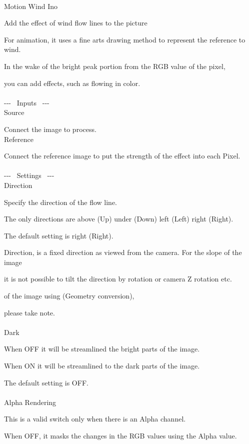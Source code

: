 \documentclass[a4paper,12pt]{article}
\begin{document}
\thispagestyle{empty}

\Large
\noindent \\
Motion Wind Ino\medskip
\par
\normalsize
Add the effect of wind flow lines to the picture\\
\par
For animation, it uses a fine arts drawing method to represent the reference to wind.\par
In the wake of the bright peak portion from the RGB value of the pixel,\par
you can add effects, such as flowing in color.\\
\\
-{-}- \ Inputs \ -{-}-\\
Source\par
Connect the image to process.\\
Reference\par
Connect the reference image to put the strength of the effect into each Pixel.\\
\\
-{-}- \ Settings \ -{-}-\\
Direction\par
Specify the direction of the flow line.\par
The only directions are above (Up) under (Down) left (Left) right (Right).\par
The default setting is right (Right).\par
Direction, is a fixed direction as viewed from the camera. For the slope of the image\par
it is not possible to tilt the direction by rotation or camera Z rotation etc.\par
of the image using (Geometry conversion),\par
please take note.\\
\\
Dark\par
When OFF it will be streamlined the bright parts of the image.\par
When ON it will be streamlined to the dark parts of the image.\par
The default setting is OFF.\\
\\
Alpha Rendering\par
This is a valid switch only when there is an Alpha channel.\par
When OFF, it masks the changes in the RGB values using the Alpha value.\par
\end{document}
